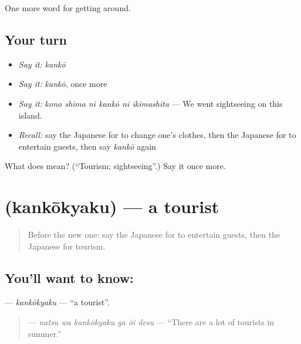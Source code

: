 \begin{grammarlens}[title={What you've built}]
One more word for getting around.
\end{grammarlens}

\subsection*{Your turn}
\begin{itemize}
\raggedright
  \item \emph{Say it:} \emph{kankō}
  \item \emph{Say it:} \emph{kankō}, once more
  \item \emph{Say it:} \emph{kono shima ni kankō ni ikimashita} — We went sightseeing on this island.
  \item \emph{Recall:} say the Japanese for to change one's clothes, then the Japanese for to entertain guests, then say \emph{kankō} again
\end{itemize}

\begin{tcolorbox}[breakable,colback=teal!4,colframe=teal!35!black,title={Before you move on}]
What does  mean? (\textquotedblleft{}Tourism; sightseeing\textquotedblright{}.) Say it once more.
\end{tcolorbox}
\section[\texorpdfstring{\ja{かんこうきゃく} (kankōkyaku)}{かんこうきゃく (kankōkyaku)}]{ (kankōkyaku) — a tourist}

\label{lesson:JA-C402-kankoukyaku}



\begin{quote}
Before the new one: say the Japanese for to entertain guests, then the Japanese for tourism.
\end{quote}

\subsection*{You'll want to know: }
\textbf{} — \emph{kankōkyaku} — \textquotedblleft{}a tourist\textquotedblright{}.

\begin{quote}
\textbf{  } — \emph{natsu wa kankōkyaku ga ōi desu} — \textquotedblleft{}There are a lot of tourists in summer.\textquotedblright{}
\end{quote}

